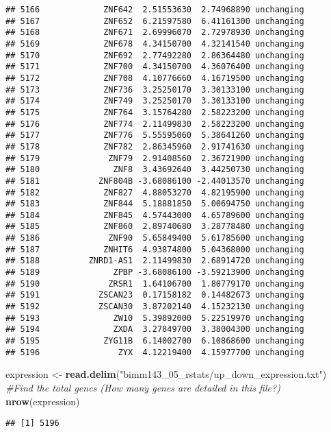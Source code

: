 \documentclass[]{article}
\newenvironment{Shaded}{\begin{snugshade}}{\end{snugshade}}
\newcommand{\CommentTok}[1]{\textcolor[rgb]{0.56,0.35,0.01}{\textit{#1}}}
\newcommand{\KeywordTok}[1]{\textcolor[rgb]{0.13,0.29,0.53}{\textbf{#1}}}
\newcommand{\NormalTok}[1]{#1}
\newcommand{\StringTok}[1]{\textcolor[rgb]{0.31,0.60,0.02}{#1}}
\begin{document}
\begin{verbatim}
## 5166             ZNF642  2.51553630  2.74968890 unchanging
## 5167             ZNF652  6.21597580  6.41161300 unchanging
## 5168             ZNF671  2.69996070  2.72978930 unchanging
## 5169             ZNF678  4.34150700  4.32141540 unchanging
## 5170             ZNF692  2.77492280  2.86364480 unchanging
## 5171             ZNF700  4.34150700  4.36076400 unchanging
## 5172             ZNF708  4.10776660  4.16719500 unchanging
## 5173             ZNF736  3.25250170  3.30133100 unchanging
## 5174             ZNF749  3.25250170  3.30133100 unchanging
## 5175             ZNF764  3.15764280  2.58223200 unchanging
## 5176             ZNF774  2.11499830  2.58223200 unchanging
## 5177             ZNF776  5.55595060  5.38641260 unchanging
## 5178             ZNF782  2.86345960  2.91741630 unchanging
## 5179              ZNF79  2.91408560  2.36721900 unchanging
## 5180               ZNF8  3.43692640  3.44250730 unchanging
## 5181            ZNF804B -3.68086100 -2.44013570 unchanging
## 5182             ZNF827  4.88053270  4.82195900 unchanging
## 5183             ZNF844  5.18881850  5.00694750 unchanging
## 5184             ZNF845  4.57443000  4.65789600 unchanging
## 5185             ZNF860  2.89740680  3.28778480 unchanging
## 5186              ZNF90  5.65849400  5.61785600 unchanging
## 5187             ZNHIT6  4.93874800  5.04368000 unchanging
## 5188          ZNRD1-AS1  2.11499830  2.68914720 unchanging
## 5189               ZPBP -3.68086100 -3.59213900 unchanging
## 5190              ZRSR1  1.64106700  1.80779170 unchanging
## 5191            ZSCAN23  0.17158182  0.14482673 unchanging
## 5192            ZSCAN30  3.87202140  4.15232130 unchanging
## 5193               ZW10  5.39892000  5.22519970 unchanging
## 5194               ZXDA  3.27849700  3.38004300 unchanging
## 5195             ZYG11B  6.14002700  6.10868600 unchanging
## 5196                ZYX  4.12219400  4.15977700 unchanging
\end{verbatim}

\begin{Shaded}
\begin{Highlighting}[]
\NormalTok{expression <-}\StringTok{ }\KeywordTok{read.delim}\NormalTok{(}\StringTok{"bimm143_05_rstats/up_down_expression.txt"}\NormalTok{)}
\CommentTok{#Find the total genes (How many genes are detailed in this file?)}
\KeywordTok{nrow}\NormalTok{(expression)}
\end{Highlighting}
\end{Shaded}

\begin{verbatim}
## [1] 5196
\end{verbatim}
\end{document}
